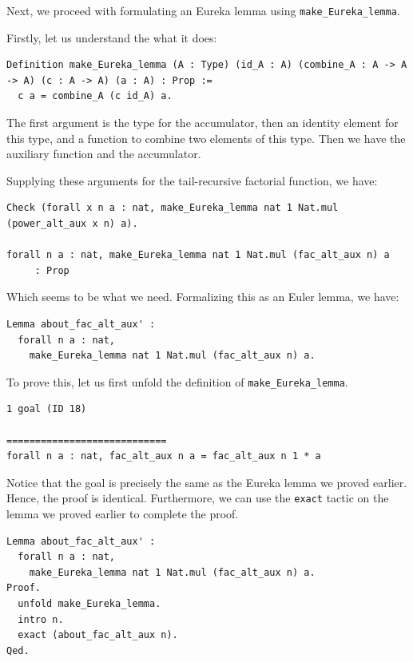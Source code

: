 \documentclass{article}
\begin{document}
Next, we proceed with formulating an Eureka lemma using \texttt{make\_Eureka\_lemma}. 

Firstly, let us understand the what it does:

\begin{lstlisting}
Definition make_Eureka_lemma (A : Type) (id_A : A) (combine_A : A -> A -> A) (c : A -> A) (a : A) : Prop :=
  c a = combine_A (c id_A) a.
\end{lstlisting}

The first argument is the type for the accumulator, then an identity element for this type, and a function to combine two elements of this type. Then we have the auxiliary function and the accumulator.

Supplying these arguments for the tail-recursive factorial function, we have:

\begin{lstlisting}
Check (forall x n a : nat, make_Eureka_lemma nat 1 Nat.mul (power_alt_aux x n) a).

forall n a : nat, make_Eureka_lemma nat 1 Nat.mul (fac_alt_aux n) a
     : Prop

\end{lstlisting}

Which seems to be what we need. Formalizing this as an Euler lemma, we have:

\begin{lstlisting}
Lemma about_fac_alt_aux' :
  forall n a : nat,
    make_Eureka_lemma nat 1 Nat.mul (fac_alt_aux n) a.
\end{lstlisting}

To prove this, let us first unfold the definition of \texttt{make\_Eureka\_lemma}.

\begin{lstlisting}
1 goal (ID 18)

============================
forall n a : nat, fac_alt_aux n a = fac_alt_aux n 1 * a
\end{lstlisting}

Notice that the goal is precisely the same as the Eureka lemma we proved earlier. Hence, the proof is identical. Furthermore, we can use the \texttt{exact} tactic on the lemma we proved earlier to complete the proof.

\begin{lstlisting}
Lemma about_fac_alt_aux' :
  forall n a : nat,
    make_Eureka_lemma nat 1 Nat.mul (fac_alt_aux n) a.
Proof.
  unfold make_Eureka_lemma.
  intro n.
  exact (about_fac_alt_aux n).
Qed.
\end{lstlisting}
\end{document}
